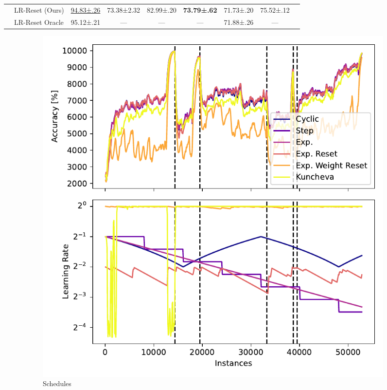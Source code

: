 \documentclass[runningheads]{llncs}
\begin{document}
\begin{table}[ht]
\begin{tabular}{llccccccc}
		                                                    & LR-Reset (Ours)                                  & \underline{94.83±.26} & 73.38±2.32          & 82.99±.20             & \bfseries 73.79±.62   & 71.73±.20             & 75.52±.12             \\
		                                                    & LR-Reset Oracle                                  & 95.12±.21             & ---                 & ---                   & ---                   & 71.88±.26             & ---                   \\
		\bottomrule
	\end{tabular}
	\label{tab:lr_resetting}
\end{table}

\begin{figure}[ht]
	\centering
	\begin{subfigure}[b]{0.47\textwidth}
		\includegraphics[width=\textwidth]{figures/lr_norms_schedules_insects_abrupt.pdf}
		\caption{Schedules}
		\label{fig:prequential_schedulers_insects}
	\end{subfigure}
	\begin{subfigure}[b]{0.47\textwidth}

\end{subfigure}
\end{figure}
\end{document}
